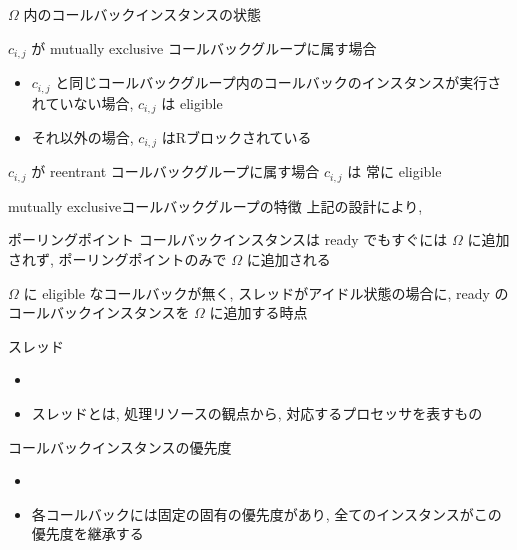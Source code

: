 \begin{frame}{$\Omega$ 内のコールバックインスタンスの状態}
    \begin{block}{$c_{i, j}$ が mutually exclusive コールバックグループに属す場合}
        \setlength{\linewidth}{0.98\columnwidth}
        \begin{itemize}
            \item $c_{i, j}$ と同じコールバックグループ内のコールバックのインスタンスが実行されていない場合, $c_{i, j}$ は eligible
            \item それ以外の場合, $c_{i, j}$ はRブロックされている
        \end{itemize}
    \end{block}
    \begin{block}{$c_{i, j}$ が reentrant コールバックグループに属す場合}
        $c_{i, j}$ は 常に eligible
    \end{block}
\end{frame}

\begin{frame}{mutually exclusiveコールバックグループの特徴}
    上記の設計により, 
\end{frame}


\begin{frame}{ポーリングポイント}
    コールバックインスタンスは ready でもすぐには $\Omega$ に追加されず, ポーリングポイントのみで $\Omega$ に追加される
    \begin{definition}[ポーリングポイント]
        $\Omega$ に eligible なコールバックが無く, スレッドがアイドル状態の場合に, ready のコールバックインスタンスを $\Omega$ に追加する時点
    \end{definition}
\end{frame}

\begin{frame}{スレッド}
    \begin{itemize}
        \item {}
        \item スレッドとは, 処理リソースの観点から, 対応するプロセッサを表すもの
    \end{itemize}
\end{frame}

\begin{frame}{コールバックインスタンスの優先度}
    \begin{itemize}
        \item {}
        \item 各コールバックには固定の固有の優先度があり, 全てのインスタンスがこの優先度を継承する
    \end{itemize}
\end{frame}

